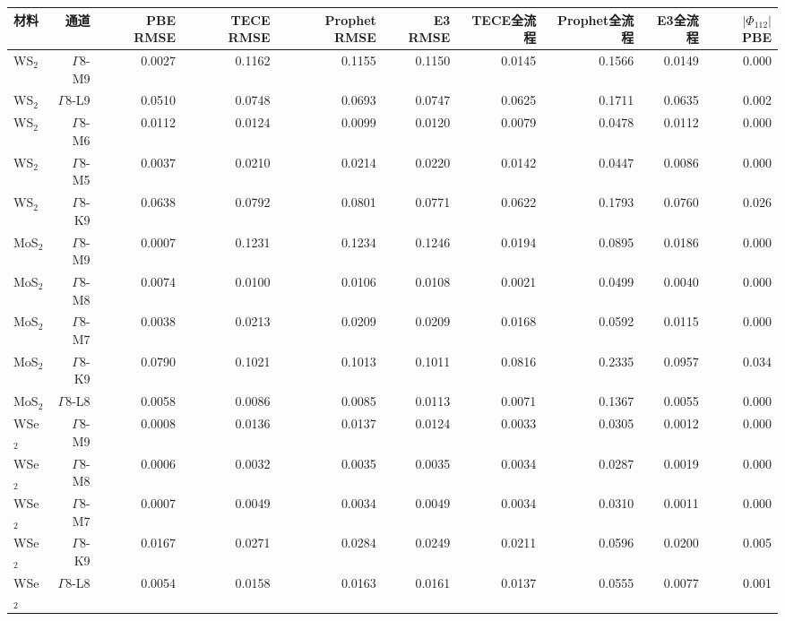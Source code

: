 \begin{tabular}{lrrrrrrrrr}
\toprule
材料 & 通道 & PBE RMSE & TECE RMSE & Prophet RMSE & E3 RMSE & TECE全流程 & Prophet全流程 & E3全流程 & $|\Phi_{112}|$ PBE \\
\midrule
WS$_2$ & $\Gamma$8-M9 & 0.0027 & 0.1162 & 0.1155 & 0.1150 & 0.0145 & 0.1566 & 0.0149 & 0.000 \\
WS$_2$ & $\Gamma$8-L9 & 0.0510 & 0.0748 & 0.0693 & 0.0747 & 0.0625 & 0.1711 & 0.0635 & 0.002 \\
WS$_2$ & $\Gamma$8-M6 & 0.0112 & 0.0124 & 0.0099 & 0.0120 & 0.0079 & 0.0478 & 0.0112 & 0.000 \\
WS$_2$ & $\Gamma$8-M5 & 0.0037 & 0.0210 & 0.0214 & 0.0220 & 0.0142 & 0.0447 & 0.0086 & 0.000 \\
WS$_2$ & $\Gamma$8-K9 & 0.0638 & 0.0792 & 0.0801 & 0.0771 & 0.0622 & 0.1793 & 0.0760 & 0.026 \\
MoS$_2$ & $\Gamma$8-M9 & 0.0007 & 0.1231 & 0.1234 & 0.1246 & 0.0194 & 0.0895 & 0.0186 & 0.000 \\
MoS$_2$ & $\Gamma$8-M8 & 0.0074 & 0.0100 & 0.0106 & 0.0108 & 0.0021 & 0.0499 & 0.0040 & 0.000 \\
MoS$_2$ & $\Gamma$8-M7 & 0.0038 & 0.0213 & 0.0209 & 0.0209 & 0.0168 & 0.0592 & 0.0115 & 0.000 \\
MoS$_2$ & $\Gamma$8-K9 & 0.0790 & 0.1021 & 0.1013 & 0.1011 & 0.0816 & 0.2335 & 0.0957 & 0.034 \\
MoS$_2$ & $\Gamma$8-L8 & 0.0058 & 0.0086 & 0.0085 & 0.0113 & 0.0071 & 0.1367 & 0.0055 & 0.000 \\
WSe$_2$ & $\Gamma$8-M9 & 0.0008 & 0.0136 & 0.0137 & 0.0124 & 0.0033 & 0.0305 & 0.0012 & 0.000 \\
WSe$_2$ & $\Gamma$8-M8 & 0.0006 & 0.0032 & 0.0035 & 0.0035 & 0.0034 & 0.0287 & 0.0019 & 0.000 \\
WSe$_2$ & $\Gamma$8-M7 & 0.0007 & 0.0049 & 0.0034 & 0.0049 & 0.0034 & 0.0310 & 0.0011 & 0.000 \\
WSe$_2$ & $\Gamma$8-K9 & 0.0167 & 0.0271 & 0.0284 & 0.0249 & 0.0211 & 0.0596 & 0.0200 & 0.005 \\
WSe$_2$ & $\Gamma$8-L8 & 0.0054 & 0.0158 & 0.0163 & 0.0161 & 0.0137 & 0.0555 & 0.0077 & 0.001 \\
\bottomrule
\end{tabular}
